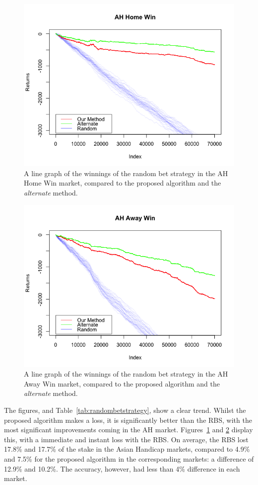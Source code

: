 \documentclass[a4paper,10pt]{report}
\begin{document}
\begin{figure}[h!]\begin{center}
	\includegraphics[width=.65\textwidth]{model_05_AHH.png}  
	\caption{A line graph of the winnings of the random bet strategy in the AH Home Win market, compared to the proposed algorithm and the \textit{alternate} method.}\label{FIG:03_03_randomstrat_AHH}
\end{center}\end{figure}
\begin{figure}[h!]\begin{center}
	\includegraphics[width=.65\textwidth]{model_05_AHA.png}  
	\caption{A line graph of the winnings of the random bet strategy in the AH Away Win market, compared to the proposed algorithm and the \textit{alternate} method.}\label{FIG:03_03_randomstrat_AHA}
\end{center}\end{figure}

\pagebreak

The figures, and Table~\ref{tab:randombetstrategy}, show a clear trend. Whilst the proposed algorithm makes a loss, it is significantly better than the RBS, with the most significant improvements coming in the AH market. Figures~\ref{FIG:03_03_randomstrat_AHH} and \ref{FIG:03_03_randomstrat_AHA} display this, with a immediate and instant loss with the RBS. On average, the RBS lost 17.8\% and 17.7\% of the stake in the Asian Handicap markets, compared to 4.9\% and 7.5\% for the proposed algorithm in the corresponding markets: a difference of 12.9\% and 10.2\%. The accuracy, however, had less than 4\% difference in each market. 
\end{document}
